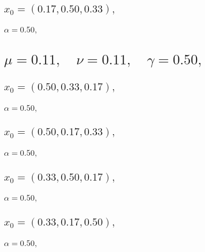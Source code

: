 \documentclass[a4paper]{article}
\begin{document}
\begin{multicols*}{2}
   \subsection{\(x_0 = (0.17,0.50,0.33),\quad \)}
   

   \subsubsection{\(\alpha = 0.50,\quad \)}
   

   \section{\(\mu = 0.11,\quad \nu = 0.11,\quad \gamma = 0.50,\quad \)}
   

   \subsection{\(x_0 = (0.50,0.33,0.17),\quad \)}
   

   \subsubsection{\(\alpha = 0.50,\quad \)}
   

   \subsection{\(x_0 = (0.50,0.17,0.33),\quad \)}
   

   \subsubsection{\(\alpha = 0.50,\quad \)}
   

   \subsection{\(x_0 = (0.33,0.50,0.17),\quad \)}
   

   \subsubsection{\(\alpha = 0.50,\quad \)}
   

   \subsection{\(x_0 = (0.33,0.17,0.50),\quad \)}
   

   \subsubsection{\(\alpha = 0.50,\quad \)}
   


\end{multicols*}
\end{document}
